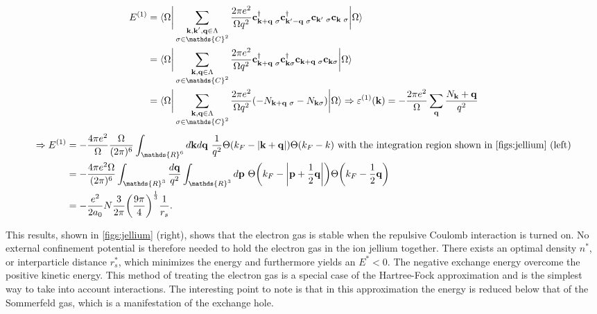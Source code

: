 \begin{equation}
    \begin{split}
        E^{(1)} &= \langle {\Omega} \bigg|  \sum_{\substack{{\bf k},{\bf k}',{\bf q} \in \Lambda\\
    \sigma \in \mathds{C}^2}} \frac{2\pi e^2}{\Omega q^2} {\bf c}_{{\bf k}+{\bf q} \blanky \sigma}^\dagger {\bf c}_{{\bf k}'-{\bf q} \blanky \sigma}^\dagger {\bf c}_{{\bf k}' \blanky \sigma} {\bf c}_{{\bf k} \blanky \sigma} \bigg| {\Omega} \rangle \\
    &= \langle {\Omega} \bigg|  \sum_{\substack{{\bf k},{\bf q} \in \Lambda\\
    \sigma \in \mathds{C}^2}} \frac{2\pi e^2}{\Omega q^2} {\bf c}_{{\bf k}+{\bf q} \blanky \sigma}^\dagger {\bf c}_{{\bf k} \sigma}^\dagger {\bf c}_{{\bf k}+{\bf q} \blanky \sigma} {\bf c}_{{\bf k} \sigma} \bigg| {\Omega} \rangle \\
    &= \langle {\Omega} \bigg|  \sum_{\substack{{\bf k},{\bf q} \in \Lambda\\
    \sigma \in \mathds{C}^2}} \frac{2\pi e^2}{\Omega q^2} (-N_{{\bf k}+{\bf q} \blanky \sigma} - N_{{\bf k} \sigma}) \bigg| {\Omega} \rangle  \Rightarrow \varepsilon^{(1)}({\bf k}) = - \frac{2\pi e^2}{\Omega} \sum_{{\bf q}} \frac{N_{{\bf k}} + {\bf q}}{q^2} \\
    \end{split}
\end{equation}
\begin{equation}
    \begin{split}
    \Rightarrow E^{(1)} &= -\frac{4\pi e^2}{\Omega} \frac{\Omega}{(2\pi)^6} \int_{\mathds{R}^6} d{\bf k} d{\bf q} \blanky \frac{1}{q^2} \Theta(k_F - |{\bf k} + {\bf q}|) \Theta(k_F - k) \textnormal{ with the integration region shown in \cref{figs:jellium} (left)}  \\
    &= - \frac{4\pi e^2 \Omega}{(2\pi)^6} \int_{\mathds{R}^3} \frac{d{\bf q}}{q^2} \int_{\mathds{R}^3} d{\bf p} \blanky \Theta\bigg(k_F - \bigg| {\bf p} + \frac{1}{2} {\bf q}\bigg|\bigg) \Theta\bigg(k_F - \frac{1}{2} {\bf q}\bigg) \\
    &= -\frac{e^2}{2a_0} N \frac{3}{2\pi} \bigg(\frac{9 \pi}{4}\bigg)^{\frac{1}{3}} \frac{1}{r_s}.
    \end{split}
\end{equation}

This results, shown in \cref{figs:jellium} (right), shows that the electron gas is stable when the repulsive Coulomb interaction is turned on. No external confinement potential is therefore needed to hold the electron gas in the ion jellium together. There exists an optimal density $n^*$, or interparticle distance $r_s^*$, which minimizes the energy and furthermore yields an $E^* < 0$. The negative exchange energy overcome the positive kinetic energy. This method of treating the electron gas is a special case of the Hartree-Fock approximation and is the simplest way to take into account interactions. The interesting point to note is that in this approximation the energy is reduced below that of the Sommerfeld gas, which is a manifestation of the exchange hole. 

